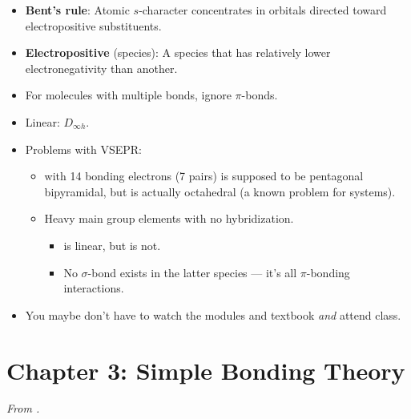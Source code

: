\documentclass[../main.tex]{subfiles}
\begin{document}
\begin{itemize}
\begin{itemize}
    \end{itemize}
    \item \textbf{Bent's rule}: Atomic $s$-character concentrates in orbitals directed toward electropositive substituents.
    \item \textbf{Electropositive} (species): A species that has relatively lower electronegativity than another.
    \item For molecules with multiple bonds, ignore $\pi$-bonds.
    \item Linear: $D_{\infty h}$.
    \item Problems with VSEPR:
    \begin{itemize}
        \item {} with 14 bonding electrons (7 pairs) is supposed to be pentagonal bipyramidal, but is actually octahedral (a known problem for  systems).
        \item Heavy main group elements with no hybridization.
        \begin{itemize}
            \item {} is linear, but  is not.
            \item No $\sigma$-bond exists in the latter species --- it's all $\pi$-bonding interactions.
        \end{itemize}
    \end{itemize}
    \item You maybe don't have to watch the modules and textbook \emph{and} attend class.
\end{itemize}



\section{Chapter 3: Simple Bonding Theory}
\emph{From \textcite{bib:MiesslerFischerTarr}.}
\end{document}
